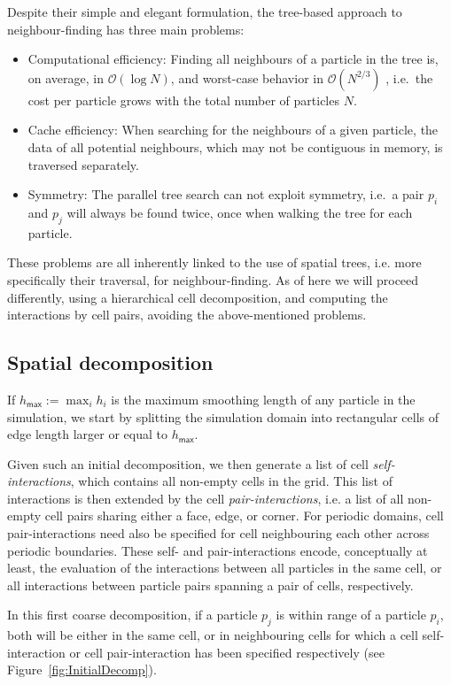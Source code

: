\documentclass[a4paper,conference]{IEEEtran}
\newcommand{\oh}[1]
    {\mbox{$ {\mathcal O}( #1 ) $}}
\newcommand{\fig}[1]
    {Figure~\ref{fig:#1}}
\begin{document}
Despite their simple and elegant formulation, the tree-based
approach to neighbour-finding has three main problems:
\begin{itemize}
    \item Computational efficiency: Finding all neighbours
        of a particle in the tree is, on average, in \oh{\log N},
        and worst-case behavior in \oh{N^{2/3}} \cite{ref:Lee1977},
        i.e.~the cost per particle grows with the
        total number of particles $N$.
    \item Cache efficiency: When searching for the neighbours of a
        given particle, the data of all potential neighbours, which may
        not be contiguous in memory, is traversed separately.
    \item Symmetry: The parallel tree search can not exploit symmetry,
        i.e.~a pair $p_i$ and $p_j$ will always be found twice,
        once when walking the tree for each particle.
\end{itemize}
    
These problems are all inherently linked to the use of
spatial trees, i.e. more specifically their traversal,
for neighbour-finding.
As of here we will proceed differently, using a hierarchical cell
decomposition, and computing the interactions by cell pairs,
avoiding the above-mentioned problems.


\subsection{Spatial decomposition}

If $h_\mathsf{max} := \max_i  h_i $ is the maximum smoothing
length of any particle in the simulation, we start by splitting
the simulation domain into rectangular cells of edge length
larger or equal to $h_\mathsf{max}$.

Given such an initial decomposition, we then generate
a list of cell {\em self-interactions}, which contains all
non-empty cells in the grid.
This list of interactions is then extended by the cell
{\em pair-interactions}, i.e. a list of all non-empty cell pairs
sharing either a face, edge, or corner.
For periodic domains, cell pair-interactions need also be
specified for cell neighbouring each other across
periodic boundaries.
These self- and pair-interactions encode, conceptually at least,
the evaluation of the interactions between all particles
in the same cell, or all interactions between particle pairs
spanning a pair of cells, respectively.

In this first coarse decomposition, if a particle $p_j$
is within range of a particle $p_i$, both will be either
in the same cell, or in neighbouring cells for which a
cell self-interaction or cell pair-interaction has been
specified respectively (see \fig{InitialDecomp}).
\end{document}
